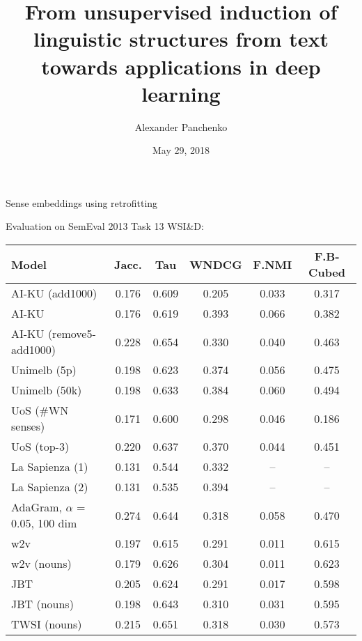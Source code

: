 \documentclass[usenames,dvipsnames]{beamer}
\title[From unsupervised induction of linguistic
structures to applications in deep learning]{From unsupervised induction of linguistic
structures from text towards applications in deep learning}
\author[A. Panchenko]{Alexander Panchenko}
\date[29.05.2018]{May 29, 2018}
\begin{document}
\maketitle


%
%
%
%



\begin{frame}{Sense embeddings using retrofitting}

Evaluation on SemEval 2013 Task 13  WSI\&D:


	\vspace{-0.4cm}
	\begin{table}
		\scriptsize

		\begin{tabular}{l|ccc|cc}
			\bf Model & \bf Jacc. & \bf Tau & \bf WNDCG & \bf F.NMI & \bf F.B-Cubed \\ 
			\midrule
			
			AI-KU (add1000) & 0.176 & 0.609 & 0.205 & 0.033 & 0.317 \\
			AI-KU & 0.176 & 0.619 & 0.393 & 0.066 & 0.382 \\
			AI-KU (remove5-add1000) & 0.228 & 0.654 & 0.330 & 0.040 & 0.463 \\
			Unimelb (5p) & 0.198 & 0.623 & 0.374 & 0.056 & 0.475 \\
			Unimelb (50k) & 0.198 & 0.633 & 0.384 & 0.060 & 0.494 \\
			UoS (\#WN senses) & 0.171 & 0.600 & 0.298 & 0.046 & 0.186 \\
			UoS (top-3) & 0.220 & 0.637 & 0.370 & 0.044 & 0.451 \\
			La Sapienza (1) & 0.131 & 0.544 & 0.332 & --  & -- \\
			La Sapienza (2) & 0.131 & 0.535 & 0.394 & -- & -- \\ \midrule
			AdaGram, $\alpha$ = 0.05, 100 dim & 0.274 & 0.644  & 0.318  & 0.058  & 0.470  \\ \midrule
			\alert{w2v}  & 0.197 & 0.615 & 0.291 & 0.011 & 0.615 \\
			\alert{w2v (nouns)} & 0.179 & 0.626 & 0.304 & 0.011 & 0.623 \\
			
			\alert{JBT} & 0.205 & 0.624 & 0.291 & 0.017 & 0.598\\
			\alert{JBT (nouns)} & 0.198 & 0.643 & 0.310 & 0.031 & 0.595\\
			\alert{TWSI (nouns)} & 0.215 & 0.651 & 0.318 & 0.030 & 0.573 \\ 
				
		\end{tabular}
		\end{table}
\end{frame}





\end{document}
